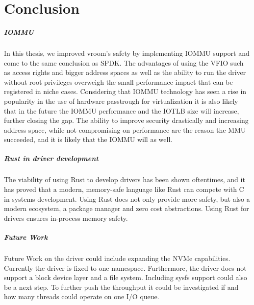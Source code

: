 \chapter{Conclusion}
\paragraph{IOMMU}
In this thesis, we improved vroom's safety by implementing IOMMU support and come to the same conclusion as SPDK. The advantages of using the VFIO such as access rights and bigger address spaces as well as the ability to run the driver without root privileges overweigh the small performance impact that can be registered in niche cases.
Considering that IOMMU technology has seen a rise in popularity in the use of hardware passtrough for virtualization it is also likely that in the future the IOMMU performance and the IOTLB size will increase, further closing the gap. The ability to improve security drastically and increasing address space, while not compromising on performance are the reason the MMU succeeded, and it is likely that the IOMMU will as well.

\paragraph{Rust in driver development}
The viability of using Rust to develop drivers has been shown oftentimes, and it has proved that a modern, memory-safe language like Rust can compete with C in systems development. Using Rust does not only provide more safety, but also a modern ecosystem, a package manager and zero cost abstractions. Using Rust for drivers ensures in-process memory safety.

\paragraph{Future Work}
Future Work on the driver could include expanding the NVMe capabilities. Currently the driver is fixed to one namespace. Furthermore, the driver does not support a block device layer and a file system. Including sysfs support could also be a next step.
To further push the throughput it could be investigated if and how many threads could operate on one I/O queue.
